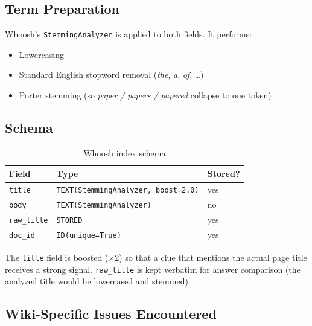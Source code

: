 \documentclass[11pt]{article}
\begin{document}
\subsection{Term Preparation}

Whoosh's \texttt{StemmingAnalyzer} is applied to both fields. It performs:

\begin{itemize}
  \item Lowercasing
  \item Standard English stopword removal (\emph{the}, \emph{a}, \emph{of}, \ldots)
  \item Porter stemming (so \emph{paper / papers / papered} collapse to one token)
\end{itemize}

\subsection{Schema}

\begin{table}[h]
\centering
\begin{tabular}{lll}
\toprule
\textbf{Field} & \textbf{Type} & \textbf{Stored?} \\
\midrule
\texttt{title}     & \texttt{TEXT(StemmingAnalyzer, boost=2.0)} & yes \\
\texttt{body}      & \texttt{TEXT(StemmingAnalyzer)}            & no  \\
\texttt{raw\_title} & \texttt{STORED}                            & yes \\
\texttt{doc\_id}   & \texttt{ID(unique=True)}                   & yes \\
\bottomrule
\end{tabular}
\caption{Whoosh index schema}
\end{table}

The \texttt{title} field is boosted ($\times$2) so that a clue that mentions
the actual page title receives a strong signal. \texttt{raw\_title} is kept
verbatim for answer comparison (the analyzed title would be lowercased and
stemmed).

\subsection{Wiki-Specific Issues Encountered}
\end{document}
